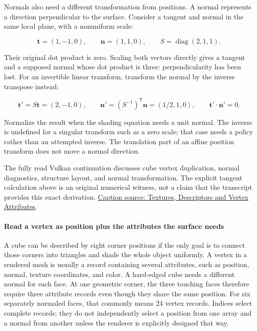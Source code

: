 Normals also need a different transformation from positions. A normal represents a direction perpendicular to the surface. Consider a tangent and normal in the same local plane, with a nonuniform scale:

\[
\mathbf{t}=(1,-1,0),\qquad \mathbf{n}=(1,1,0),\qquad S=\operatorname{diag}(2,1,1).
\]

Their original dot product is zero. Scaling both vectors directly gives a tangent  and a supposed normal  whose dot product is three: perpendicularity has been lost. For an invertible linear transform, transform the normal by the inverse transpose instead:

\[
\mathbf{t}'=S\mathbf{t}=(2,-1,0),\qquad
\mathbf{n}'=(S^{-1})^{\mathsf T}\mathbf{n}=(1/2,1,0),\qquad
\mathbf{t}'\cdot\mathbf{n}'=0.
\]

Normalize the result when the shading equation needs a unit normal. The inverse is undefined for a singular transform such as a zero scale; that case needs a policy rather than an attempted inverse. The translation part of an affine position transform does not move a normal direction.

The fully read Vulkan continuation discusses cube vertex duplication, normal diagnostics, structure layout, and normal transformation. The explicit tangent calculation above is an original numerical witness, not a claim that the transcript provides this exact derivation. \href{https://www.youtube.com/watch?v=QFf91u8bZlk}{Caption source: Textures, Descriptors and Vertex Attributes}.

\paragraph{Read a vertex as position plus the attributes the surface needs}\label{06-engine-ii-ch025-read-a-vertex-as-position-plus-the-attributes-the-surface-needs}

\hypertarget{06-engine-ii-ch025-read-a-vertex-as-position-plus-the-attributes-the-surface-needs}{}

A cube can be described by eight corner positions if the only goal is to connect those corners into triangles and shade the whole object uniformly. A vertex in a rendered mesh is usually a record containing several attributes, such as position, normal, texture coordinates, and color. A hard-edged cube needs a different normal for each face. At one geometric corner, the three touching faces therefore require three attribute records even though they share the same position. For six separately normaled faces, that commonly means 24 vertex records. Indices select complete records; they do not independently select a position from one array and a normal from another unless the renderer is explicitly designed that way.


